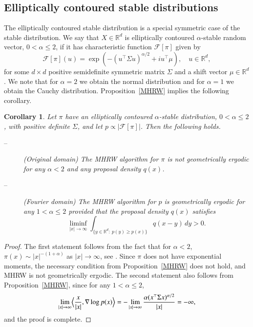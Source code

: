 \documentclass[preprint, 3p, authoryear]{elsarticle}
\newcommand{\E}{\mathsf{E}}
\newcommand{\R}{\mathbb R}
\newcommand{\T}{\top}
\newtheorem{corollary}{Corollary}
\theoremstyle{definition}
\begin{document}
\subsection{Elliptically contoured stable distributions}
The elliptically contoured stable distribution
is a special symmetric case of the stable distribution. 
We say that $X\in\R^d$ is elliptically contoured $\alpha$-stable random vector, $0<\alpha\leq2$,
if it has characteristic function $\mathcal{F}[\pi]$ given by
\[
	\mathcal{F}[\pi](u) %
	= \exp\left( - (u^{\T}\Sigma u)^{\alpha/2} + i u^{\T}\mu \right),\quad u\in\mathbb{R}^{d},
\]
for some $d \times d$ positive semidefinite symmetric matrix $\Sigma$ and a shift vector $\mu\in\R^d$.
We note that for $\alpha = 2$ we obtain the normal distribution and
for $\alpha = 1$ we obtain the Cauchy distribution. Proposition~\ref{MHRW} implies 
the following corollary.
\par
\begin{corollary}
	Let $\pi$ have an elliptically contoured $\alpha$-stable distribution, $0<\alpha\leq2$,
	with positive definite $\Sigma$,
	and let $p \propto |\mathcal{F}[\pi]|$.
	Then the following holds.
\begin{description}
	\item[--] (Original domain) The MHRW algorithm for $\pi$ is not geometrically ergodic for any $\alpha<2$ and any proposal density $q(x)$.
	\item[--] (Fourier domain) The MHRW algorithm for $p$ is geometrically ergodic for any $1<\alpha\leq2$ provided that 
	the proposal density $q(x)$ satisfies 
	\[
		\liminf_{|x|\to\infty} \int_{ \{ y\in\R^d: \ p(y) \ge p(x) \}} q(x-y) \, dy > 0.
	\]
\end{description}
\end{corollary}
\begin{proof}
The first statement follows from the fact that for $\alpha<2$, $\pi(x)\sim|x|^{-(1+\alpha)}$ as $|x|\to\infty$, 
see \cite{nolan2018}. 
Since $\pi$ does not have exponential moments, the necessary condition from Proposition~\ref{MHRW}
does not hold, and MHRW is not geometrically ergodic. The second statement also follows from 
Proposition~\ref{MHRW}, since for any $1<\alpha\leq2$,
\[
\lim_{|x|\to\infty} \Bigl\langle \frac{x}{|x|} , \nabla\log p(x) \Bigr\rangle=-\lim_{|x|\to\infty} 
 \frac{\alpha (x^\top \Sigma x)^{\alpha/2}}{|x|}=-\infty,
\]
and the proof is complete.
\end{proof}
\end{document}
